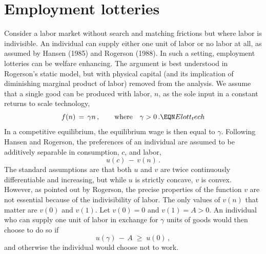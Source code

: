 \section{Employment lotteries}\label{Empl_lottery}%
Consider a labor market without search and matching frictions but
where labor is indivisible. An individual can supply either
one unit of labor or no labor at all, as assumed by Hansen (1985)
and Rogerson (1988).
%
In such a setting, employment lotteries can
be welfare enhancing. The argument is best understood in
Rogerson's static model, but with physical capital (and its
implication of diminishing marginal product of labor)
removed from the analysis.  We assume that a single good
can be produced with labor, $n$, as the sole input in a
constant returns to scale technology,
$$
f(n) \,=\, \gamma n\,,  \qquad \hbox{\rm where} \quad \gamma >0\,.  \EQN Elott_tech
$$
In a competitive equilibrium, the equilibrium wage is then equal to
$\gamma$.
Following Hansen and Rogerson, the preferences of an individual
are assumed to be additively separable in consumption, $c$, and labor,
$$
u(c) \,-\, v(n)\,.
$$
The standard assumptions are that both $u$ and $v$ are twice continuously
differentiable and increasing, but while $u$ is strictly concave,
$v$ is convex. However, as pointed out by Rogerson, the precise
properties of the function $v$ are not essential because of the
indivisibility of labor. The only values of $v(n)$ that matter
are $v(0)$ and $v(1)$. Let $v(0)=0$
and $v(1)=A>0$. An individual who can supply one unit of labor
in exchange for $\gamma$ units of goods would then choose to do
so if
$$
u(\gamma) \,-\, A \;\geq\; u(0)\,,
$$
and otherwise the individual would choose not to work.

